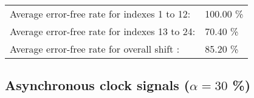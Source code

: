 \begin{table}[h]
\begin{center}
\begin{tabular}{|c|c|c|c|c|}
\end{tabular}


\flushleft
\begin{tabular}{l l}
Average error-free rate for indexes  1 to 12: & 100.00 \% \\
Average error-free rate for indexes 13 to 24: &  70.40 \% \\
Average error-free rate for overall shift   : &  85.20 \% \\

\end{tabular}


\end{center}
\end{table}


\pagebreak
\subsection{Asynchronous clock signals ($\alpha=30$ \%)}

